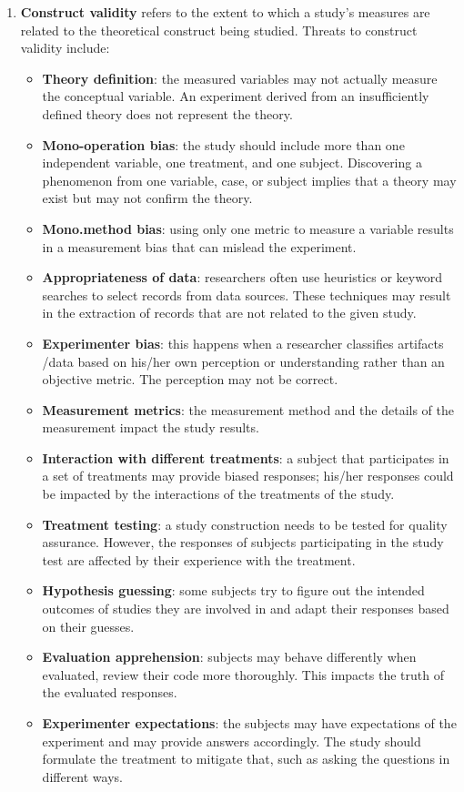 \begin{enumerate}
    \item \textbf{Construct validity} refers to the extent to which a study's measures are related to the theoretical construct being studied. 
    Threats to construct validity include:
    \begin{itemize}
        \item \textbf{Theory definition}: the measured variables may not actually measure the conceptual variable. An experiment derived from an insufficiently defined theory does not represent the theory.
        \item \textbf{Mono-operation bias}: the study should include more than one independent variable, one treatment, and one subject. Discovering a phenomenon from one variable, case, or subject implies that a theory may exist but may not confirm the theory.
        \item \textbf{Mono.method bias}: using only one metric to measure a variable results in a measurement bias that can mislead the experiment.
        \item \textbf{Appropriateness of data}: researchers often use heuristics or keyword searches to select records from data sources. These techniques may result in the extraction of records that are not related to the given study.
        \item \textbf{Experimenter bias}: this happens when a researcher classifies artifacts /data based on his/her own perception or understanding rather than an objective metric. The perception may not be correct.
        \item \textbf{Measurement metrics}: the measurement method and the details of the measurement impact the study results.
        \item \textbf{Interaction with different treatments}: a subject that participates in a set of treatments may provide biased responses; his/her responses could be impacted by the interactions of the treatments of the study.
        \item \textbf{Treatment testing}: a study construction needs to be tested for quality assurance. However, the responses of subjects participating in the study test are affected by their experience with the treatment.
        \item \textbf{Hypothesis guessing}: some subjects try to figure out the intended outcomes of studies they are involved in and adapt their responses based on their guesses.
        \item \textbf{Evaluation apprehension}: subjects may behave differently when evaluated, \eg review their code more thoroughly. This impacts the truth of the evaluated responses.
        \item \textbf{Experimenter expectations}: the subjects may have expectations of the experiment and may provide answers accordingly. The study should formulate the treatment to mitigate that, such as asking the questions in different ways.
    \end{itemize}
    

\end{enumerate}
